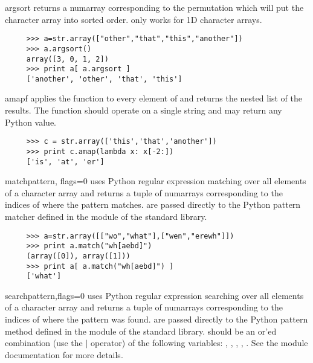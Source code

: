 \begin{methoddesc}[RawCharArray]{argsort}{}
    returns a numarray corresponding to the permutation which will
   put the character array  into sorted order.   only
   works for 1D character arrays.
\begin{verbatim}
     >>> a=str.array(["other","that","this","another"])
     >>> a.argsort()
     array([3, 0, 1, 2])
     >>> print a[ a.argsort ] 
     ['another', 'other', 'that', 'this']
\end{verbatim}
\end{methoddesc}
\begin{methoddesc}[RawCharArray]{amap}{f}
   applies the function  to every element of  and
  returns the nested list of the results.  The function  should operate
  on a single string and may return any Python value.
\end{methoddesc}
\begin{verbatim}
     >>> c = str.array(['this','that','another'])
     >>> print c.amap(lambda x: x[-2:])
     ['is', 'at', 'er']
\end{verbatim}
\begin{methoddesc}[RawCharArray]{match}{pattern, flags=0}
   uses Python regular expression matching over all elements of a
  character array and returns a tuple of numarrays corresponding to the indices
  of  where the pattern matches.  are passed directly to
  the Python pattern matcher defined in the  module of the standard
  library.
\begin{verbatim}
     >>> a=str.array([["wo","what"],["wen","erewh"]])
     >>> print a.match("wh[aebd]")
     (array([0]), array([1]))
     >>> print a[ a.match("wh[aebd]") ]
     ['what']
\end{verbatim}
\end{methoddesc}
\begin{methoddesc}[RawCharArray]{search}{pattern,flags=0}
   uses Python regular expression searching over all elements of a
  character array and returns a tuple of numarrays corresponding to the indices
  of  where the pattern was found.  are passed directly
  to the Python pattern  method defined in the  module of
  the standard library.   should be an or'ed combination (use the
  $\vert$ operator) of the following  variables: ,
  , , , .  See the
   module documentation for more details.
\end{methoddesc}
